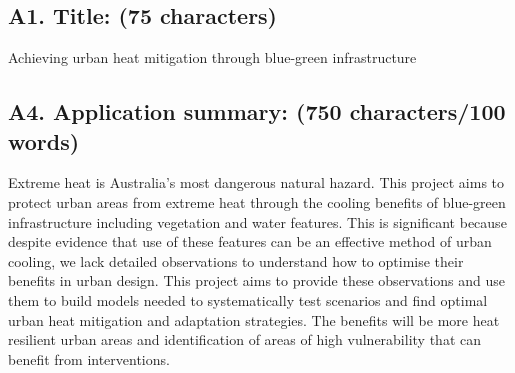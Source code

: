 \subsection*{\TitleFont A1. Title: (75 characters) }


Achieving urban heat mitigation through blue-green infrastructure



\subsection*{\TitleFont A4. Application summary: (750 characters/100 words) }







Extreme heat is Australia’s most dangerous natural hazard. This project aims to protect urban areas from extreme heat through the cooling benefits of blue-green infrastructure including vegetation and water features. This is significant because despite evidence that use of these features can be an effective method of urban cooling, we lack detailed observations to understand how to optimise their benefits in urban design. This project aims to provide these observations and use them to build models needed to systematically test scenarios and find optimal urban heat mitigation and adaptation strategies. The benefits will be more heat resilient urban areas and identification of areas of high vulnerability that can benefit from interventions.


